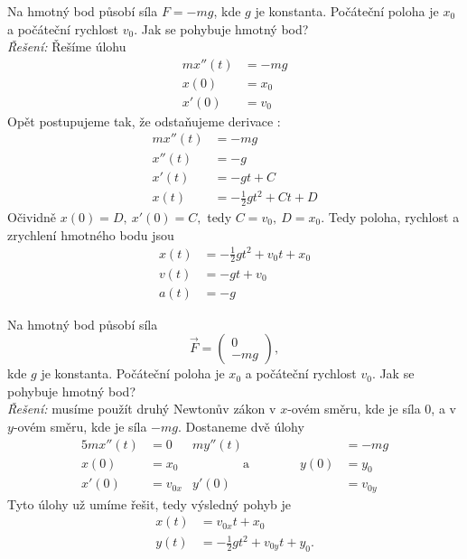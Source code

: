 \begin{příklad}
  Na hmotný bod působí síla $F=-mg$, kde $g$ je konstanta. Počáteční poloha je $x_0$ a počáteční rychlost $v_0$. Jak se pohybuje hmotný bod?\\
  \textit{Řešení:} Řešíme úlohu
\begin{align*}
	mx''(t) &= -mg \\
	x(0) &= x_0 \\
	x'(0) &= v_0
\end{align*}
Opět postupujeme tak, že odstaňujeme derivace :
\begin{align*}
	mx''(t) &= -mg \\
	x''(t) &= -g \\
	x'(t) &= -gt+ C \\
	x(t) &= -\frac{1}{2}gt^{2}+Ct+D
\end{align*}
Očividně $x(0)=D,\ x'(0)=C,$ tedy $C=v_0,\ D=x_0.$ Tedy poloha, rychlost a zrychlení hmotného bodu jsou
\begin{align*}
	x(t)&=-\frac{1}{2}gt^{2}+v_0t+x_0 \\
	v(t)&=-gt+v_0 \\
	a(t)&=-g
\end{align*}
\end{příklad}

\begin{příklad}
Na hmotný bod působí síla 
\begin{equation*}
	\vec{F}=\begin{pmatrix}0\\ -mg\end{pmatrix},
\end{equation*}
kde $g$ je konstanta. Počáteční poloha je $x_0$ a počáteční rychlost $v_0$. Jak se pohybuje hmotný bod?\\
\textit{Řešení:} musíme použít druhý Newtonův zákon v $x$-ovém směru, kde je síla $0$, a v $y$-ovém směru, kde je síla $-mg$. Dostaneme dvě úlohy
\begin{alignat*}{5}
  mx''(t) &= 0 & my''(t) &= -mg \\
  x(0) &= x_0 & \hspace{4em} \text{a} \hspace{4em}       y(0) &= y_0 \quad \\
  x'(0) &= v_{0x} & 		           y'(0) &= v_{0y}
\end{alignat*}
Tyto úlohy už umíme řešit, tedy výsledný pohyb je
\begin{align*}
	x(t) &= v_{0x}t+x_0 \\
	y(t) &= -\frac{1}{2}gt^{2}+v_{0y}t+y_0.
\end{align*}
\end{příklad}

